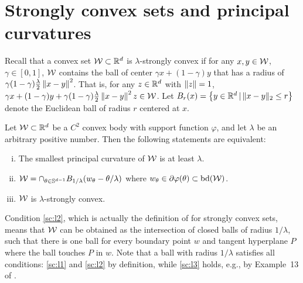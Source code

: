 \appendix


\section{Strongly convex sets and principal curvatures}
Recall that a convex set $\mathcal{W}\subset \mathbb{R}^d$ is $\lambda$-strongly convex if for any $x,y\in \mathcal{W}$, $\gamma\in [0,1]$, $\mathcal{W}$ contains the ball of center $\gamma x + (1-\gamma) y$ that has a radius of $\gamma(1-\gamma) \frac{\lambda}{2} \left\| x-y \right\|^2$.
That is, for any $z\in \mathbb{R}^d$ with $\left\| z \right\|=1$, $\gamma x + (1-\gamma) y + \gamma(1-\gamma) \frac{\lambda}{2} \left\| x-y \right\|^2 z\in \mathcal{W}$.
Let $B_r(x)=\left\{y \in \mathbb{R}^d \,\vert\,  \|x-y\|_2 \le r \right\}$ denote the Euclidean ball of radius $r$ centered at $x$.

\begin{prop}
\label{strongconvex}
Let $\mathcal{W} \subset \mathbb{R}^d$ be a $C^2$ convex body with support function $\varphi$, %
and let $\lambda$ be an arbitrary positive number.
Then the following statements are equivalent:
\begin{enumerate}[(i)]
\item \label{sc:l1} The smallest principal curvature of $\mathcal{W}$ is at least $\lambda$.
\item \label{sc:l2} $\cW= {\large \cap}_{\theta \in \bS^{d-1} }{B_{1/\lambda} (w_\theta- \theta /\lambda)}$ where $w_\theta \in \partial \varphi(\theta) \subset \mathrm{bd}(\mathcal{W})$.
\item \label{sc:l3} $\mathcal{W}$ is $\lambda$-strongly convex.
\end{enumerate}
\end{prop}
Condition \eqref{sc:l2}, which is actually the definition of \citet{Pol96} for strongly convex sets, means that $\mathcal{W}$ can be obtained as the intersection of closed balls of radius $1/\lambda$, such that there is one ball for every boundary point $w$ and  tangent hyperplane $P$ where the ball touches $P$ in $w$. Note that a ball with radius $1/\lambda$ satisfies all conditions: \eqref{sc:l1} and \eqref{sc:l2} by definition, while \eqref{sc:l3} holds, e.g., by Example~13 of \citet{JourneeNRS10}.

